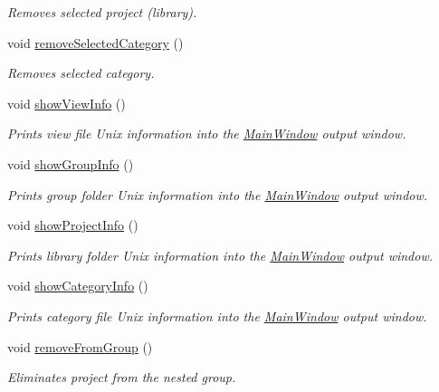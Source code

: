 \begin{DoxyCompactItemize}
\begin{DoxyCompactList}\small\item\em Removes selected project (library). \end{DoxyCompactList}\item 
void \hyperlink{classMainWindow_ac091629e8f90351cc3543337aefc80ea}{remove\-Selected\-Category} ()
\begin{DoxyCompactList}\small\item\em Removes selected category. \end{DoxyCompactList}\item 
void \hyperlink{classMainWindow_a6e334fe603796652be44d5df952e0f4a}{show\-View\-Info} ()
\begin{DoxyCompactList}\small\item\em Prints view file Unix information into the \hyperlink{classMainWindow}{Main\-Window} output window. \end{DoxyCompactList}\item 
void \hyperlink{classMainWindow_a7792544db8869842840c6e4716f8cbec}{show\-Group\-Info} ()
\begin{DoxyCompactList}\small\item\em Prints group folder Unix information into the \hyperlink{classMainWindow}{Main\-Window} output window. \end{DoxyCompactList}\item 
void \hyperlink{classMainWindow_a2fbeb11fb0bbe28be62403ef732931a7}{show\-Project\-Info} ()
\begin{DoxyCompactList}\small\item\em Prints library folder Unix information into the \hyperlink{classMainWindow}{Main\-Window} output window. \end{DoxyCompactList}\item 
void \hyperlink{classMainWindow_ad63d5f418c4d55c90d63269162782ac4}{show\-Category\-Info} ()
\begin{DoxyCompactList}\small\item\em Prints category file Unix information into the \hyperlink{classMainWindow}{Main\-Window} output window. \end{DoxyCompactList}\item 
void \hyperlink{classMainWindow_a41872370d39dc3c6dc8b996d42196432}{remove\-From\-Group} ()
\begin{DoxyCompactList}\small\item\em Eliminates project from the nested group. \end{DoxyCompactList}\item 

\end{DoxyCompactItemize}
